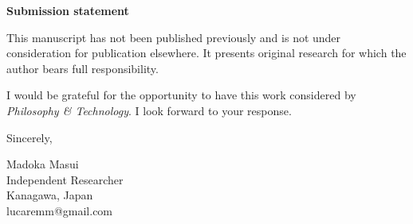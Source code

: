 \documentclass[12pt]{article}
\begin{document}
\bigskip

\noindent\textbf{Submission statement}

This manuscript has not been published previously and is not under consideration for publication elsewhere. It presents original research for which the author bears full responsibility.

\bigskip

I would be grateful for the opportunity to have this work considered by \textit{Philosophy \& Technology}. I look forward to your response.

\bigskip

\noindent Sincerely,

\bigskip\bigskip

\noindent Madoka Masui\\
Independent Researcher\\
Kanagawa, Japan\\
lucaremm@gmail.com
\end{document}
